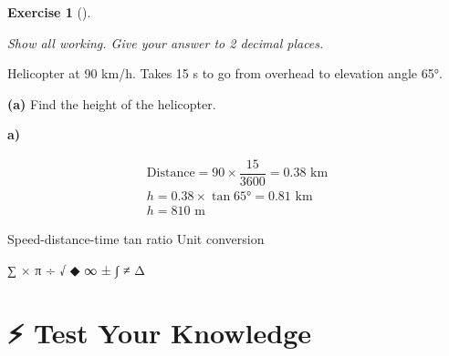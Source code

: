 \documentclass[
  letterpaper,
  DIV=11,
  numbers=noendperiod]{scrreprt}
\theoremstyle{definition}
\newtheorem{exercise}{Exercise}[chapter]
\theoremstyle{remark}
\begin{document}
\begin{exercise}[]\protect\hypertarget{exr-trig-34}{}\label{exr-trig-34}

\emph{Show all working. Give your answer to 2 decimal places.}

Helicopter at 90 km/h. Takes 15 s to go from overhead to elevation angle
65°.

\textbf{(a)} Find the height of the helicopter.

\begin{tcolorbox}[enhanced jigsaw, opacitybacktitle=0.6, coltitle=black, arc=.35mm, colframe=quarto-callout-tip-color-frame, colback=white, bottomrule=.15mm, left=2mm, colbacktitle=quarto-callout-tip-color!10!white, titlerule=0mm, opacityback=0, title=\textcolor{quarto-callout-tip-color}{\faLightbulb}\hspace{0.5em}{🔍 View Solution}, leftrule=.75mm, breakable, rightrule=.15mm, bottomtitle=1mm, toptitle=1mm, toprule=.15mm]

\textbf{a)}

\[
\begin{aligned}
\text{Distance} = 90 \times \dfrac{15}{3600} = 0.38 \text{ km} \\ h = 0.38 \times \tan 65° = 0.81 \text{ km} \\ h = 810 \text{ m}
\end{aligned}
\]

\end{tcolorbox}

{Speed-distance-time} {tan ratio} {Unit conversion}

\end{exercise}

∑ × π ÷ √ ◆ ∞ ± ∫ ≠ Δ

\section{⚡ Test Your Knowledge}\label{sec-trig-worksheet}
\end{document}
